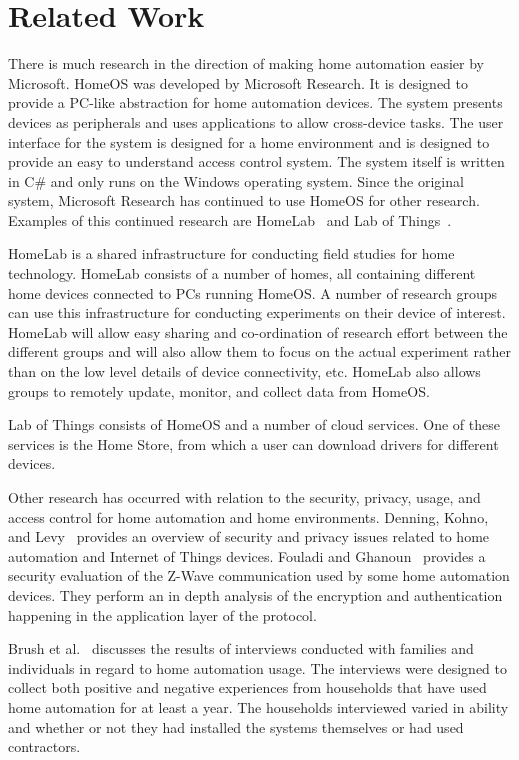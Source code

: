 \section{Related Work}
\label{sec:related}
There is much research in the direction of making home automation easier by
Microsoft. HomeOS was developed by Microsoft Research. It is designed to provide
a PC-like abstraction for home automation devices. The system presents devices
as peripherals and uses applications to allow cross-device tasks. The user
interface for the system is designed for a home environment and is designed to
provide an easy to understand access control system. The system itself is
written in C\# and only runs on the Windows operating system. Since the original
system, Microsoft Research has continued to use HomeOS for other research.
Examples of this continued research are HomeLab~\cite{homeLab} and Lab of
Things~\cite{labOfThings}.

HomeLab is a shared infrastructure for conducting field studies for home
technology. HomeLab consists of a number of homes, all containing different home
devices connected to PCs running HomeOS. A number of research groups can use
this infrastructure for conducting experiments on their device of interest.
HomeLab will allow easy sharing and co-ordination of research effort between the
different groups and will also allow them to focus on the actual experiment
rather than on the low level details of device connectivity, etc. HomeLab also
allows groups to remotely update, monitor, and collect data from HomeOS.

Lab of Things consists of HomeOS and a number of cloud services. One of these
services is the Home Store, from which a user can download drivers for different
devices.

Other research has occurred with relation to the security, privacy, usage, and
access control for home automation and home environments. Denning, Kohno, and
Levy~\cite{modernHome} provides an overview of security and privacy issues
related to home automation and Internet of Things devices. Fouladi and
Ghanoun~\cite{zwavesecurity} provides a security evaluation of the Z-Wave
communication used by some home automation devices. They perform an in depth
analysis of the encryption and authentication happening in the application layer
of the protocol.

Brush et al.~\cite{homeAutomation} discusses the results of interviews conducted
with families and individuals in regard to home automation usage. The
interviews were designed to collect both positive and negative experiences from
households that have used home automation for at least a year. The households
interviewed varied in ability and whether or not they had installed the systems
themselves or had used contractors.

